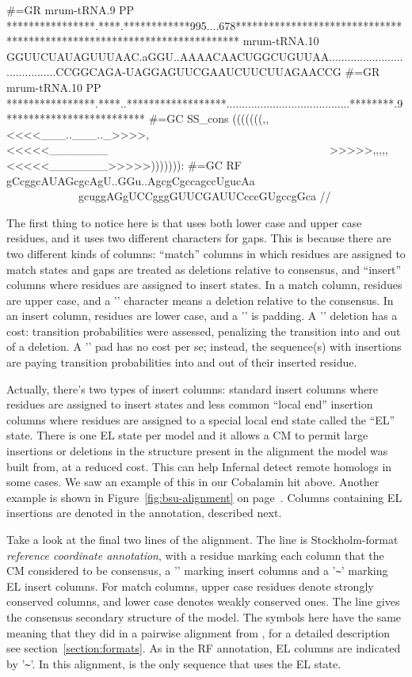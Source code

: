 \begin{tinysreoutput}
#=GR mrum-tRNA.9  PP ****************.****.************995....678************************************************************************
mrum-tRNA.10         GGUUCUAUAGUUUAAC.aGGU..AAAACAACUGGCUGUUAA........................................CCGGCAGA-UAGGAGUUCGAAUCUUCUUAGAACCG
#=GR mrum-tRNA.10 PP ****************.****..******************........................................********.9*************************
#=GC SS_cons         (((((((,,<<<<___..___.._>>>>,<<<<<_______~~~~~~~~~~~~~~~~~~~~~~~~~~~~~~~~~~~~~~~~>>>>>,,,,,<<<<<_______>>>>>))))))):
#=GC RF              gCcggcAUAGcgcAgU..GGu..AgcgCgccagccUgucAa~~~~~~~~~~~~~~~~~~~~~~~~~~~~~~~~~~~~~~~~gcuggAGgUCCgggGUUCGAUUCcccGUgccgGca
//
\end{tinysreoutput}

The first thing to notice here is that  uses both lower
case and upper case residues, and it uses two different characters for
gaps. This is because there are two different kinds of columns:
``match'' columns in which residues are assigned to match states and
gaps are treated as deletions relative to consensus, and ``insert''
columns where residues are assigned to insert states.
In a match column, residues are upper case, and a '\otext{-}'
character means a deletion relative to the consensus. In an insert
column, residues are lower case, and a '' is padding.  A '\otext{-}' deletion
has a cost: transition probabilities were assessed, penalizing the
transition into and out of a deletion. A '' pad has no cost per se;
instead, the sequence(s) with insertions are paying transition
probabilities into and out of their inserted residue.

Actually, there's two types of insert columns: standard insert columns
where residues are assigned to insert states and less common ``local end''
insertion columns where residues are assigned to a special local end
state called the ``EL'' state. There is one EL state per model and it
allows a CM to permit large insertions or deletions in the structure
present in the alignment the model was built from, at a reduced
cost. This can help Infernal detect remote homologs in some cases. We
saw an example of this in our Cobalamin  hit
above. Another example is shown in Figure~\ref{fig:bsu-alignment} on
page~\pageref{fig:bsu-alignment}. Columns containing EL insertions are
denoted in the  annotation, described next.

Take a look at the final two lines of the alignment. The  line is Stockholm-format \emph{reference coordinate annotation},
with a residue marking each column that the CM considered to be
consensus, a '' marking insert columns and a '\verb+~+'
marking EL insert columns. For match columns, upper case residues
denote strongly conserved columns, and lower case denotes weakly
conserved ones. The  line gives the consensus
secondary structure of the model. The symbols here have the same
meaning that they did in a pairwise alignment from ,
for a detailed description see section~\ref{section:formats}. As in the
RF annotation, EL columns are indicated by '\verb+~+'. In this
alignment,  is the only sequence that uses the EL
state.

